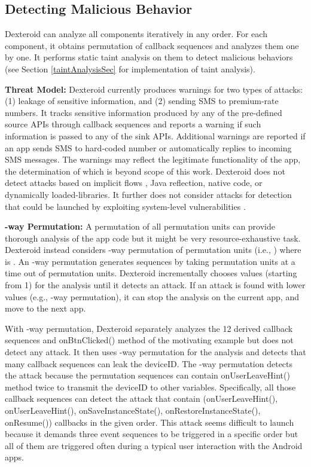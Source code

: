 \documentclass[10pt]{elsarticle}
\begin{document}
\subsection {Detecting Malicious Behavior} \label{secMalBehavior}

Dexteroid can analyze all components iteratively in any order. For each component, it obtains permutation of callback sequences and analyzes them one by one. It performs static taint analysis on them to detect malicious behaviors (see Section \ref{taintAnalysisSec} for implementation of taint analysis). 

{\noindent \bf Threat Model:} Dexteroid currently produces warnings for two types of attacks: (1) leakage of sensitive information, and (2) sending SMS to premium-rate numbers. It tracks sensitive information produced by any of the pre-defined source APIs through callback sequences and reports a warning if such information is passed to any of the sink APIs. Additional warnings are reported if an app sends SMS to hard-coded number or automatically replies to incoming SMS messages. The warnings may reflect the legitimate functionality of the app, the determination of which is beyond scope of this work. Dexteroid does not detect attacks based on implicit flows \cite{implicitFlows}, Java reflection, native code, or dynamically loaded-libraries. It further does not consider attacks for detection that could be launched by exploiting system-level vulnerabilities \cite{dissectingAndroid, perils}.  

{\noindent \bf -way Permutation:} A permutation of all permutation units can provide thorough analysis of the app code but it might be very resource-exhaustive task. Dexteroid instead considers -way permutation of  permutation units (i.e., ) where  is . An -way permutation generates sequences by taking  permutation units at a time out of  permutation units. Dexteroid incrementally chooses  values (starting from 1) for the analysis until it detects an attack. If an attack is found with lower  values (e.g., -way permutation), it can stop the analysis on the current app, and move to the next app. 

With -way permutation, Dexteroid separately analyzes the 12 derived callback sequences and {\ttfamily onBtnClicked()} method of the motivating example but does not detect any attack. It then uses -way permutation for the analysis and detects that many callback sequences can leak the deviceID. The -way permutation detects the attack because the permutation sequences can contain {\ttfamily onUserLeaveHint()} method twice to transmit the deviceID to other variables. Specifically, all those callback sequences can detect the attack that contain ({\ttfamily onUserLeaveHint()}, {\ttfamily onUserLeaveHint()}, {\ttfamily onSaveInstanceState()}, {\ttfamily onRestoreInstanceState()}, {\ttfamily onResume()}) callbacks in the given order. This attack seems difficult to launch because it demands three event sequences to be triggered in a specific order but all of them are triggered often during a typical user interaction with the Android apps. 
\end{document}
